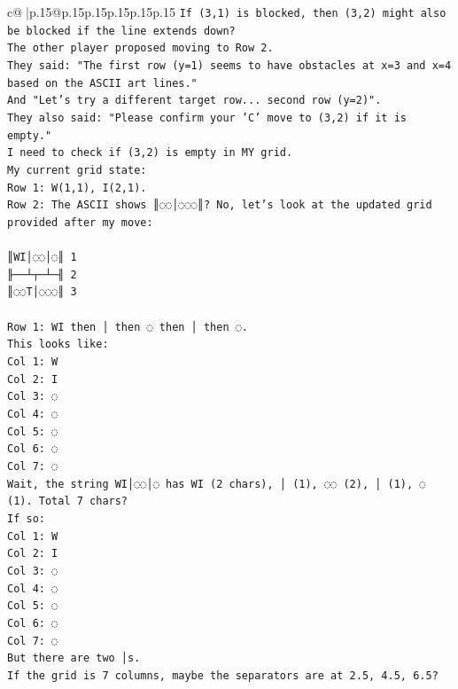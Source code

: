 \documentclass{article}
\begin{document}
{\begin{supertabular}{c@{$\;$}|p{.15\linewidth}@{}p{.15\linewidth}p{.15\linewidth}p{.15\linewidth}p{.15\linewidth}p{.15\linewidth}}
{{{\texttt{If (3,1) is blocked, then (3,2) might also be blocked if the line extends down?} \\
\texttt{The other player proposed moving to Row 2.} \\
\texttt{They said: "The first row (y=1) seems to have obstacles at x=3 and x=4 based on the ASCII art lines."} \\
\texttt{And "Let's try a different target row... second row (y=2)".} \\
\texttt{They also said: "Please confirm your 'C' move to (3,2) if it is empty."} \\
\texttt{I need to check if (3,2) is empty in MY grid.} \\
\texttt{My current grid state:} \\
\texttt{Row 1: W(1,1), I(2,1).} \\
\texttt{Row 2: The ASCII shows ║◌◌│◌◌◌║? No, let's look at the updated grid provided after my move:} \\
\\ 
\texttt{║WI│◌◌│◌║ 1} \\
\texttt{╟──┴┬─┴─╢ 2} \\
\texttt{║◌◌T│◌◌◌║ 3} \\
\\ 
\texttt{Row 1: WI then │ then ◌ then │ then ◌.} \\
\texttt{This looks like:} \\
\texttt{Col 1: W} \\
\texttt{Col 2: I} \\
\texttt{Col 3: ◌} \\
\texttt{Col 4: ◌} \\
\texttt{Col 5: ◌} \\
\texttt{Col 6: ◌} \\
\texttt{Col 7: ◌} \\
\texttt{Wait, the string WI│◌◌│◌ has WI (2 chars), │ (1), ◌◌ (2), │ (1), ◌ (1). Total 7 chars?} \\
\texttt{If so:} \\
\texttt{Col 1: W} \\
\texttt{Col 2: I} \\
\texttt{Col 3: ◌} \\
\texttt{Col 4: ◌} \\
\texttt{Col 5: ◌} \\
\texttt{Col 6: ◌} \\
\texttt{Col 7: ◌} \\
\texttt{But there are two │s.} \\
\texttt{If the grid is 7 columns, maybe the separators are at 2.5, 4.5, 6.5?} \\
}}}
\end{supertabular}}
\end{document}

